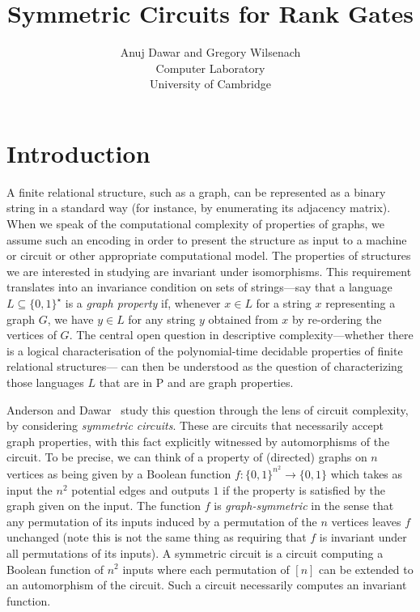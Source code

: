\documentclass[12pt]{report}
\newcommand{\PT}{\ensuremath{\mathrm{P}}\xspace}
\begin{document}
\title{Symmetric Circuits for Rank Gates}

\author{Anuj Dawar and Gregory Wilsenach \\ 
Computer Laboratory \\
University of Cambridge}

\maketitle

\tableofcontents

\chapter{Introduction}

A finite relational structure, such as a graph, can be represented as a binary
string in a standard way (for instance, by enumerating its adjacency matrix).
When we speak of the computational complexity of properties of graphs, we assume
such an encoding in order to present the structure as input to a machine or
circuit or other appropriate computational model. The properties of structures
we are interested in studying are invariant under isomorphisms. This requirement
translates into an invariance condition on sets of strings---say that a language
$L \subseteq \{0,1\}^\star$ is a \emph{graph property} if, whenever $x \in L$
for a string $x$ representing a graph $G$, we have $y\in L$ for any string $y$
obtained from $x$ by re-ordering the vertices of $G$. The central open question
in descriptive complexity---whether there is a logical characterisation of the
polynomial-time decidable properties of finite relational structures--- can then
be understood as the question of characterizing those languages $L$ that are in
$\PT$ and are graph properties.

Anderson and Dawar~\cite{AndersonD17} study this question through the lens of circuit
complexity, by considering \emph{symmetric circuits}. These are circuits that
necessarily accept graph properties, with this fact explicitly witnessed by
automorphisms of the circuit. To be precise, we can think of a property of
(directed) graphs on $n$ vertices as being given by a Boolean function $f:
\{0,1\}^{n^2} \rightarrow \{0,1\}$ which takes as input the $n^2$ potential
edges and outputs $1$ if the property is satisfied by the graph given on the
input. The function $f$ is \emph{graph-symmetric} in the sense that any permutation of
its inputs induced by a permutation of the $n$ vertices leaves $f$ unchanged
(note this is not the same thing as requiring that $f$ is invariant under all
permutations of its inputs). A symmetric circuit is a circuit computing a
Boolean function of $n^2$ inputs where each permutation of $[n]$ can be extended
to an automorphism of the circuit. Such a circuit necessarily computes an
invariant function.
\end{document}
